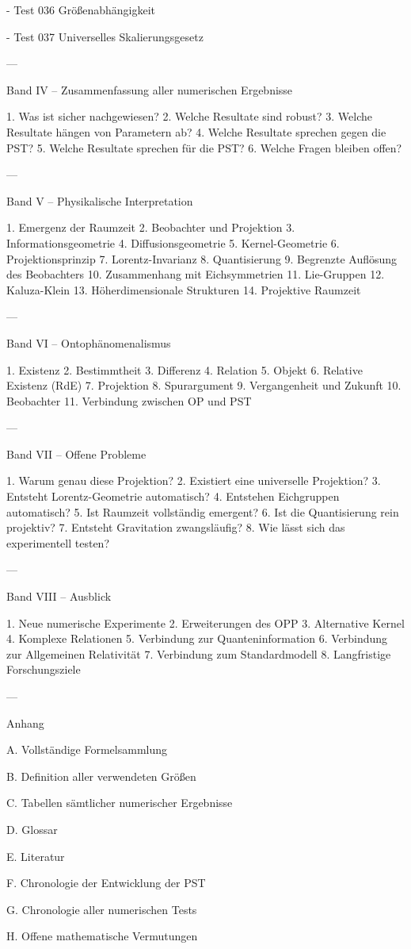- Test 036
  Größenabhängigkeit

- Test 037
  Universelles Skalierungsgesetz

---

Band IV – Zusammenfassung aller numerischen Ergebnisse

1. Was ist sicher nachgewiesen?
2. Welche Resultate sind robust?
3. Welche Resultate hängen von Parametern ab?
4. Welche Resultate sprechen gegen die PST?
5. Welche Resultate sprechen für die PST?
6. Welche Fragen bleiben offen?

---

Band V – Physikalische Interpretation

1. Emergenz der Raumzeit
2. Beobachter und Projektion
3. Informationsgeometrie
4. Diffusionsgeometrie
5. Kernel-Geometrie
6. Projektionsprinzip
7. Lorentz-Invarianz
8. Quantisierung
9. Begrenzte Auflösung des Beobachters
10. Zusammenhang mit Eichsymmetrien
11. Lie-Gruppen
12. Kaluza-Klein
13. Höherdimensionale Strukturen
14. Projektive Raumzeit

---

Band VI – Ontophänomenalismus

1. Existenz
2. Bestimmtheit
3. Differenz
4. Relation
5. Objekt
6. Relative Existenz (RdE)
7. Projektion
8. Spurargument
9. Vergangenheit und Zukunft
10. Beobachter
11. Verbindung zwischen OP und PST

---

Band VII – Offene Probleme

1. Warum genau diese Projektion?
2. Existiert eine universelle Projektion?
3. Entsteht Lorentz-Geometrie automatisch?
4. Entstehen Eichgruppen automatisch?
5. Ist Raumzeit vollständig emergent?
6. Ist die Quantisierung rein projektiv?
7. Entsteht Gravitation zwangsläufig?
8. Wie lässt sich das experimentell testen?

---

Band VIII – Ausblick

1. Neue numerische Experimente
2. Erweiterungen des OPP
3. Alternative Kernel
4. Komplexe Relationen
5. Verbindung zur Quanteninformation
6. Verbindung zur Allgemeinen Relativität
7. Verbindung zum Standardmodell
8. Langfristige Forschungsziele

---

Anhang

A. Vollständige Formelsammlung

B. Definition aller verwendeten Größen

C. Tabellen sämtlicher numerischer Ergebnisse

D. Glossar

E. Literatur

F. Chronologie der Entwicklung der PST

G. Chronologie aller numerischen Tests

H. Offene mathematische Vermutungen
